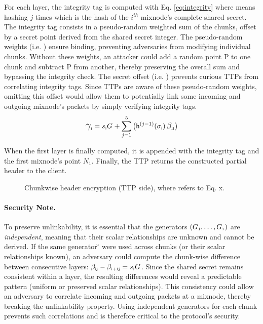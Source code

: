 \noindent
For each layer, the integrity tag is computed with Eq. \ref{eq:integrity} where  means hashing $j$ times  which is the hash of the $i^{th}$ mixnode's complete shared secret.
The integrity tag consists in a pseudo-random weighted sum of the chunks, offset by a secret point derived from the shared secret integer.
The pseudo-random weights (i.e. ) ensure binding, preventing adversaries from modifying individual chunks.
Without these weights, an attacker could add a random point P to one chunk and subtract P from another, thereby preserving the overall sum and bypassing the integrity check.
The secret offset (i.e. ) prevents curious TTPs from correlating integrity tags.
Since TTPs are aware of these pseudo-random weights, omitting this offset would allow them to potentially link some incoming and outgoing mixnode's packets by simply verifying integrity tags.
\begin{equation}
\C{i} = \sG{i}{} + \sum_{j=1}^{5} \big( \hashIt{\sHashed{i}}{j-1} \, \B{i}{j} \big)
\label{eq:integrity}
\end{equation}

When the first layer is finally computed, it is appended with the integrity tag  and the first mixnode’s point $ N_1 $.
Finally, the TTP returns the constructed partial header to the client.

\begin{figure}[H]
    \centering
    \resizebox{0.9\linewidth}{!}{}
    \caption{Chunkwise header encryption (TTP side), where \eq[x] refers to Eq. x.}
    \label{fig:chunked_schema}
\end{figure}


\paragraph{\textbf{Security Note.}}\label{note:security_why_indep_generators}
To preserve unlinkability, it is essential that the generators $ (\G{1}, \dots, \G{7}) $ are \textit{independent}, meaning that their scalar relationships are unknown and cannot be derived.
If the same generator \G{} were used across chunks (or their scalar relationships known), an adversary could compute the chunk-wise difference between consecutive layers: $ \B{i}{j} - \B{i+1}{j} = \sG{i}{} $.
Since the shared secret  remains consistent within a layer, the resulting differences would reveal a predictable pattern (uniform or preserved scalar relationships).
This consistency could allow an adversary to correlate incoming and outgoing packets at a mixnode, thereby breaking the unlinkability property.
Using independent generators for each chunk prevents such correlations and is therefore critical to the protocol's security.  


